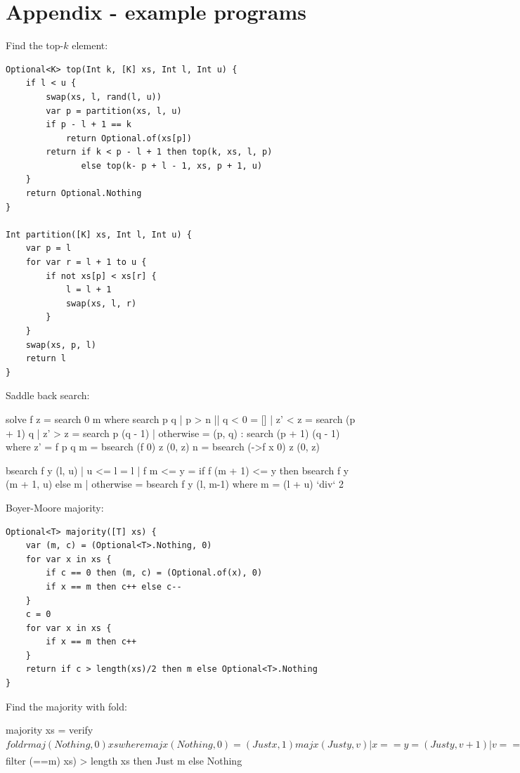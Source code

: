\documentclass[b5paper]{article}
\begin{document}
\section{Appendix - example programs}

Find the top-$k$ element:

\begin{lstlisting}[language = Bourbaki]
Optional<K> top(Int k, [K] xs, Int l, Int u) {
    if l < u {
        swap(xs, l, rand(l, u))
        var p = partition(xs, l, u)
        if p - l + 1 == k
            return Optional.of(xs[p])
        return if k < p - l + 1 then top(k, xs, l, p)
               else top(k- p + l - 1, xs, p + 1, u)
    }
    return Optional.Nothing
}

Int partition([K] xs, Int l, Int u) {
    var p = l
    for var r = l + 1 to u {
        if not xs[p] < xs[r] {
            l = l + 1
            swap(xs, l, r)
        }
    }
    swap(xs, p, l)
    return l
}
\end{lstlisting}

Saddle back search:

\begin{Haskell}
solve f z = search 0 m where
  search p q | p > n || q < 0 = []
             | z' < z = search (p + 1) q
             | z' > z = search p (q - 1)
             | otherwise = (p, q) : search (p + 1) (q - 1)
    where z' = f p q
  m = bsearch (f 0) z (0, z)
  n = bsearch (\x->f x 0) z (0, z)

bsearch f y (l, u) | u <= l = l
                   | f m <= y = if f (m + 1) <= y then bsearch f y (m + 1, u) else m
                   | otherwise = bsearch f y (l, m-1)
  where m = (l + u) `div` 2
\end{Haskell}

Boyer-Moore majority:

\begin{lstlisting}[language = Bourbaki]
Optional<T> majority([T] xs) {
    var (m, c) = (Optional<T>.Nothing, 0)
    for var x in xs {
        if c == 0 then (m, c) = (Optional.of(x), 0)
        if x == m then c++ else c--
    }
    c = 0
    for var x in xs {
        if x == m then c++
    }
    return if c > length(xs)/2 then m else Optional<T>.Nothing
}
\end{lstlisting}

Find the majority with fold:

\begin{Haskell}
majority xs = verify $ foldr maj (Nothing, 0) xs where
  maj x (Nothing, 0) = (Just x, 1)
  maj x (Just y, v) | x == y = (Just y, v + 1)
                    | v == 0 = (Just x, 1)
                    | otherwise = (Just y, v - 1)
  verify (Nothing, _) = Nothing
  verify (Just m, _)  = if 2 * (length $ filter (==m) xs) > length xs
                        then Just m else Nothing
\end{Haskell} %
\end{document}
